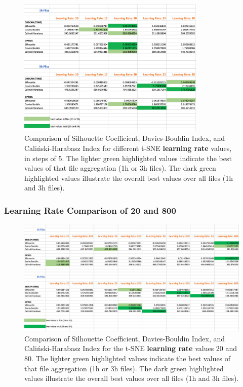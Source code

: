 \begin{figure}[H]
  \centering
  \includegraphics[width=0.8\textwidth]{./images/tsneParametersTest/learningRate/learningRateEvaluationScoresAverageDetailed3.png}
  \caption{Comparison of Silhouette Coefficient, Davies-Bouldin Index, and Caliński-Harabasz Index for different t-SNE \textbf{learning rate} values, in steps of 5. The lighter green highlighted values indicate the best values of that file aggregation (1h or 3h files). The dark green highlighted values illustrate the overall best values over all files (1h and 3h files).}
  \label{figure:learningRateEvaluationScoresAverageDetailed3}
\end{figure}






\subsubsection{Learning Rate Comparison of 20 and 800}
\label{appendig:compareLearningRate20and800}

\begin{figure}[H]
  \centering
  \includegraphics[width=1\textwidth]{./images/tsneParametersTest/learningRate/learningRateEvaluationScoresAverageDetailed4.png}
  \caption{Comparison of Silhouette Coefficient, Davies-Bouldin Index, and Caliński-Harabasz Index for the t-SNE \textbf{learning rate} values 20 and 80. The lighter green highlighted values indicate the best values of that file aggregation (1h or 3h files). The dark green highlighted values illustrate the overall best values over all files (1h and 3h files).}
  \label{figure:learningRateEvaluationScoresAverageDetailed4}
\end{figure}

